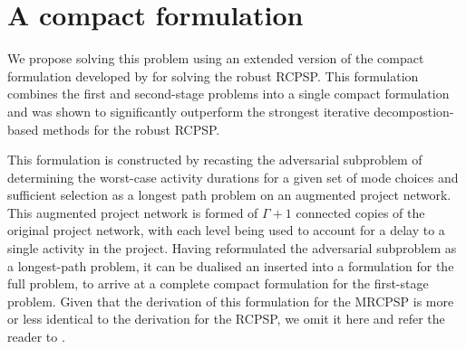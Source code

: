 \documentclass[a4paper,abstracton]{scrartcl}
\begin{document}
\section{A compact formulation}

We propose solving this problem using an extended version of the compact formulation developed by \cite{bold2021compact} for solving the robust RCPSP. This formulation combines the first and second-stage problems into a single compact formulation and was shown to significantly outperform the strongest iterative decompostion-based methods for the robust RCPSP.

This formulation is constructed by recasting the adversarial subproblem of determining the worst-case activity durations for a given set of mode choices and sufficient selection as a longest path problem on an augmented project network. This augmented project network is formed of $\Gamma+1$ connected copies of the original project network, with each level being used to account for a delay to a single activity in the project. Having reformulated the adversarial subproblem as a longest-path problem, it can be dualised an inserted into a formulation for the full problem, to arrive at a complete compact formulation for the first-stage problem. Given that the derivation of this formulation for the MRCPSP is more or less identical to the derivation for the RCPSP, we omit it here and refer the reader to \cite{bold2021compact}.
\end{document}
